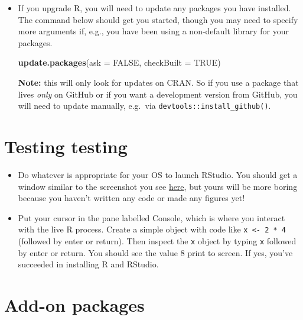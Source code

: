\documentclass[
]{book}
\newenvironment{Shaded}{\begin{snugshade}}{\end{snugshade}}
\newcommand{\DataTypeTok}[1]{\textcolor[rgb]{0.13,0.29,0.53}{#1}}
\newcommand{\KeywordTok}[1]{\textcolor[rgb]{0.13,0.29,0.53}{\textbf{#1}}}
\newcommand{\NormalTok}[1]{#1}
\newcommand{\OtherTok}[1]{\textcolor[rgb]{0.56,0.35,0.01}{#1}}
\begin{document}
\begin{itemize}
\item
  If you upgrade R, you will need to update any packages you have installed. The command below should get you started, though you may need to specify more arguments if, e.g., you have been using a non-default library for your packages.

\begin{Shaded}
\begin{Highlighting}[]
\KeywordTok{update.packages}\NormalTok{(}\DataTypeTok{ask =} \OtherTok{FALSE}\NormalTok{, }\DataTypeTok{checkBuilt =} \OtherTok{TRUE}\NormalTok{)}
\end{Highlighting}
\end{Shaded}

  \textbf{Note:} this will only look for updates on CRAN. So if you use a package that lives \emph{only} on GitHub or if you want a development version from GitHub, you will need to update manually, e.g.~via \texttt{devtools::install\_github()}.
\end{itemize}

\hypertarget{testing-testing}{%
\section{Testing testing}\label{testing-testing}}

\begin{itemize}
\item
  Do whatever is appropriate for your OS to launch RStudio. You should get a window similar to the screenshot you see \href{https://www.rstudio.com/wp-content/uploads/2014/04/rstudio-workbench.png}{here}, but yours will be more boring because you haven't written any code or made any figures yet!
\item
  Put your cursor in the pane labelled Console, which is where you interact with the live R process. Create a simple object with code like \texttt{x\ \textless{}-\ 2\ *\ 4} (followed by enter or return). Then inspect the \texttt{x} object by typing \texttt{x} followed by enter or return. You should see the value 8 print to screen. If yes, you've succeeded in installing R and RStudio.
\end{itemize}

\hypertarget{add-on-packages}{%
\section{Add-on packages}\label{add-on-packages}}
\end{document}
